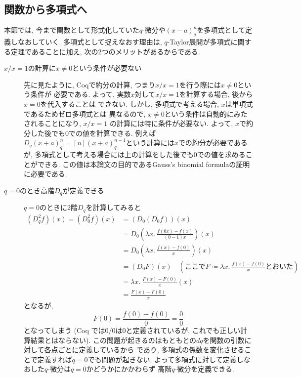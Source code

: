 \documentclass[11pt]{jsreport}
\theoremstyle{mystyle}
\newcommand{\0}{\textbf{0}}
\begin{document}
\subsection{関数から多項式へ} \label{ssec poly}
本節では, 今まで関数として形式化していた$q$-微分や$(x - a)^n_q$を多項式として定義しなおしていく. 多項式として捉えなおす理由は, $q$-Taylor展開が多項式に関する定理であることに加え, 次の2つのメリットがあるからである. 
\begin{description}
\item[$x / x = 1$の計算に$x \neq 0$という条件が必要ない]

  先に見たように, Coqで約分の計算, つまり$x / x = 1$を行う際には$x \ne 0$という条件が
  必要である. よって, 実数$x$対して$x / x = 1$を計算する場合, 後から$x = 0$を代入することは
  できない.   しかし, 多項式で考える場合, $x$は単項式であるためゼロ多項式とは
  異なるので, $x \neq 0$という条件は自動的にみたされることになり, $x / x = 1$
  の計算には特に条件が必要ない. よって, $x$で約分した後でも$0$での値を計算できる.  
  例えば$D_q (x + a)^n_q = [n](x + a)^{n - 1}_q$という計算には$x$での約分が必要であるが, 
  多項式として考える場合には上の計算をした後でも$0$での値を求めることができる. 
  この値は本論文の目的であるGauss's binomial formulaの証明に必要である. 
\item[$q = 0$のとき高階$D_q$が定義できる]

	$q = 0$のときに2階$D_q$を計算してみると
	\begin{align*}
	  (D_q ^2 f) (x) = (D_0 ^2 f) (x) &= (D_0 (D_0 f)) (x) \\
	                    &= D_0 \left( \lambda x.\ \frac{f (0 x) - f(x)}{(0 - 1)x} \right) (x) \\
	                    &= D_0 \left( \lambda x.\ \frac{f(x) - f(0)}{x} \right) (x) \\
	                    &= (D_0 F) (x)
	                      \quad (\text{ここで}F \coloneqq \lambda x.\ \frac{f(x) - f(0)}{x}
	                                \text{とおいた})\\
	                    &= \lambda x.\ \frac{F(x) - F(0)}{x} (x) \\
	                    &= \frac{F(x) - F(0)}{x}
	\end{align*}
	となるが, 
	\[
	  F(0) = \frac{f(0) - f(0)}{0} = \frac{0}{0}
	\]
	となってしまう
	(Coq では$0/0$は$0$と定義されているが, これでも正しい計算結果とはならない).
	この問題が起きるのはもともとの$dq$を関数の引数に対して各点ごとに定義しているから
	であり, 多項式の係数を変化させることで定義すれば$q = 0$でも問題が起きない. 
	よって多項式に対して定義しなおした$q$-微分は$q = 0$かどうかにかかわらず
	高階$q$-微分を定義できる. 
\end{description}
\end{document}

